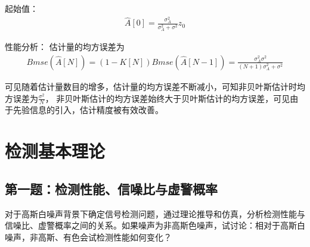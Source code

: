 \documentclass[fontset=windows]{article}
\numberwithin{figure}{section}
\begin{document}
起始值：
\begin{align*}
	\hat{A}[0]=\frac{\sigma^2_A}{\sigma^2_A+\sigma^2}z_0
\end{align*}

性能分析：
估计量的均方误差为
\begin{align*}
	Bmse(\hat{A}[N])=(1-K[N])Bmse(\hat{A}[N-1])=\frac{\sigma_A^2\sigma^2}{(N+1)\sigma^2_A+\sigma^2}
\end{align*}

可见随着估计量数目的增多，估计量的均方误差不断减小，可知非贝叶斯估计时均方误差为\(\frac{\sigma^2}{N}\)，
非贝叶斯估计的均方误差始终大于贝叶斯估计的均方误差，可见由于先验信息的引入，估计精度被有效改善。

\section{检测基本理论}
\subsection{第一题：检测性能、信噪比与虚警概率}
对于高斯白噪声背景下确定信号检测问题，通过理论推导和仿真，分析检测性能与信噪比、虚警概率之间的关系。如果噪声为非高斯色噪声，试讨论：相对于高斯白噪声，非高斯、有色会试检测性能如何变化？
\end{document}
